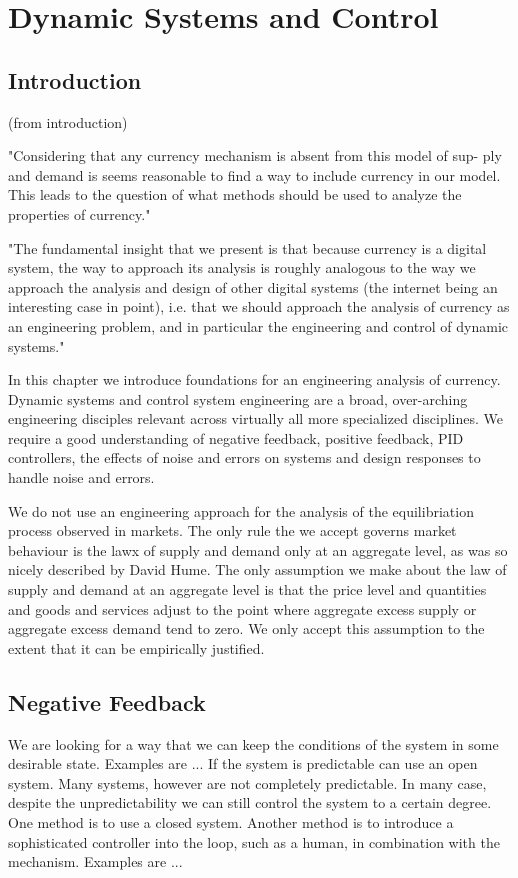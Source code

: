 \chapter{Dynamic Systems and Control}

\section{Introduction}

(from introduction)

"Considering that any currency mechanism is absent from this model of sup-
ply and demand is seems reasonable to find a way to include currency in our
model. This leads to the question of what methods should be used to analyze
the properties of currency."

"The fundamental insight that we present is that because currency is a digital
system, the way to approach its analysis is roughly analogous to the way we
approach the analysis and design of other digital systems (the internet being an
interesting case in point), i.e. that we should approach the analysis of currency
as an engineering problem, and in particular the engineering and control of
dynamic systems."

In this chapter we introduce foundations for an engineering analysis of currency. Dynamic systems
and control system engineering are a broad, over-arching engineering disciples relevant across
virtually all more specialized disciplines. We require a good understanding of negative feedback,
positive feedback, PID controllers, the effects of noise and errors on systems and design responses
to handle noise and errors.

We do not use an engineering approach for the analysis of the equilibriation process observed in
markets. The only rule the we accept governs market behaviour is the lawx of supply and demand only
at an aggregate level, as was so nicely described by David Hume. The only assumption we make about
the law of supply and demand at an aggregate level is that the price level and quantities and goods
and services adjust to the point where aggregate excess supply or aggregate excess demand tend to
zero. We only accept this assumption to the extent that it can be empirically justified.

\section{Negative Feedback}

We are looking for a way that we can keep the conditions of the system in some desirable state.
Examples are ... If the system is predictable can use an open system. Many systems, however are not
completely predictable. In many case, despite the unpredictability we can still control the system
to a certain degree. One method is to use a closed system. Another method is to introduce a
sophisticated controller into the loop, such as a human, in combination with the mechanism. Examples
are ...

